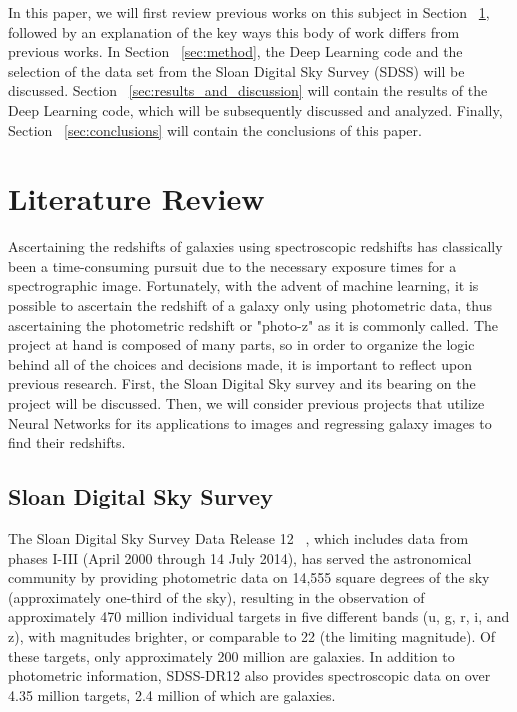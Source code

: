 \documentclass[fleqn,usenatbib]{mnras}
\begin{document}
In this paper, we will first review previous works on this subject in Section ~\ref{sec:review}, followed by an explanation of the key ways this body of work differs from previous works.  In Section ~\ref{sec:method}, the Deep Learning code and the selection of the data set from the Sloan Digital Sky Survey (SDSS) will be discussed.  Section ~\ref{sec:results_and_discussion} will contain the results of the Deep Learning code, which will be subsequently discussed and analyzed.  Finally, Section ~\ref{sec:conclusions} will contain the conclusions of this paper.

\section{Literature Review}
  \label{sec:review}
Ascertaining the redshifts of galaxies using spectroscopic redshifts has classically been a time-consuming pursuit due to the necessary exposure times for a spectrographic image.  Fortunately, with the advent of machine learning, it is possible to ascertain the redshift of a galaxy only using photometric data, thus ascertaining the photometric redshift or "photo-z" as it is commonly called.  The project at hand is composed of many parts, so in order to organize the logic behind all of the choices and decisions made, it is important to reflect upon previous research. First, the Sloan Digital Sky survey and its bearing on the project will be discussed.  Then, we will consider previous projects that utilize Neural Networks for its applications to images and regressing galaxy images to find their redshifts. 

\subsection{Sloan Digital Sky Survey}
  \label{sec:sdss}
The Sloan Digital Sky Survey Data Release 12 ~\citep[SDSS-DR12;][]{alam_DR12}, which includes data from phases I-III (April 2000 through 14 July 2014), has served the astronomical community by providing photometric data on 14,555 square degrees of the sky (approximately one-third of the sky), resulting in the observation of approximately 470 million individual targets in five different bands (u, g, r, i, and z), with magnitudes brighter, or comparable to 22 (the limiting magnitude). Of these targets, only approximately 200 million are galaxies.  In addition to photometric information, SDSS-DR12 also provides spectroscopic data on over 4.35 million targets, 2.4 million of which are galaxies.
  
\end{document}

